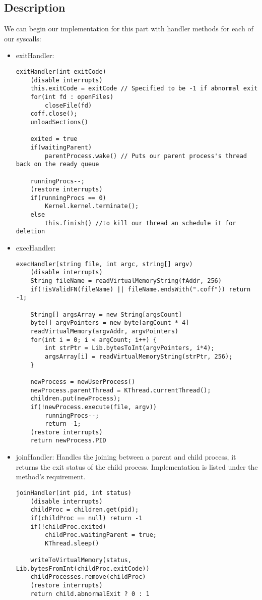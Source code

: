 \documentclass{article}
\begin{document}
\subsection*{Description}
We can begin our implementation for this part with handler methods for each of our syscalls:
\begin{itemize}
\item exitHandler:
\begin{verbatim}
exitHandler(int exitCode)
    (disable interrupts)
    this.exitCode = exitCode // Specified to be -1 if abnormal exit
	for(int fd : openFiles)
        closeFile(fd)
    coff.close();
    unloadSections() 
    
    exited = true
    if(waitingParent)
        parentProcess.wake() // Puts our parent process's thread back on the ready queue
    
    runningProcs--;
    (restore interrupts)
    if(runningProcs == 0)
        Kernel.kernel.terminate();
    else
        this.finish() //to kill our thread an schedule it for deletion
\end{verbatim}
\item execHandler: 
\begin{verbatim}
execHandler(string file, int argc, string[] argv) 
    (disable interrupts)
    String fileName = readVirtualMemoryString(fAddr, 256)
    if(!isValidFN(fileName) || fileName.endsWith(".coff")) return -1;

    String[] argsArray = new String[argsCount]
    byte[] argvPointers = new byte[argCount * 4]
    readVirtualMemory(argvAddr, argvPointers)
    for(int i = 0; i < argCount; i++) {
        int strPtr = Lib.bytesToInt(argvPointers, i*4);
        argsArray[i] = readVirtualMemoryString(strPtr, 256);
    }

    newProcess = newUserProcess() 
    newProcess.parentThread = KThread.currentThread();
    children.put(newProcess);
    if(!newProcess.execute(file, argv))
        runningProcs--;
        return -1;
    (restore interrupts)
    return newProcess.PID 
\end{verbatim}
\item joinHandler: Handles the joining between a parent and child process, it returns the 
exit status of the child process.  Implementation is listed under the method's requirement.
\begin{verbatim}
joinHandler(int pid, int status)
    (disable interrupts)
    childProc = children.get(pid);
    if(childProc == null) return -1
    if(!childProc.exited)
        childProc.waitingParent = true;
        KThread.sleep()
    
    writeToVirtualMemory(status, Lib.bytesFromInt(childProc.exitCode))
    childProcesses.remove(childProc)
    (restore interrupts)
    return child.abnormalExit ? 0 : 1
\end{verbatim}
\end{itemize}
\end{document}
